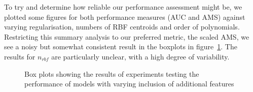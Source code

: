 

To try and determine how reliable our performance assessment might be, we plotted some figures for both performance measures (AUC and AMS) against varying regularisation, numbers of RBF centroids and order of polynomials. Restricting this summary analysis to our preferred metric, the scaled AMS, we see a noisy but somewhat consistent result in the boxplots in figure~\ref{fig:boxes}. The results for $n_{rbf}$ are particularly unclear, with a high degree of variability.

\begin{figure}[htbp]
    \begin{adjustbox}{max width=1.2\linewidth,center}
    \centering
     \hspace*{-0.9em}
     \hspace*{-0.9em}
    \end{adjustbox}
    \caption{Box plots showing the results of experiments testing the performance of models with varying inclusion of additional features}
    \label{fig:boxes}
\end{figure}

